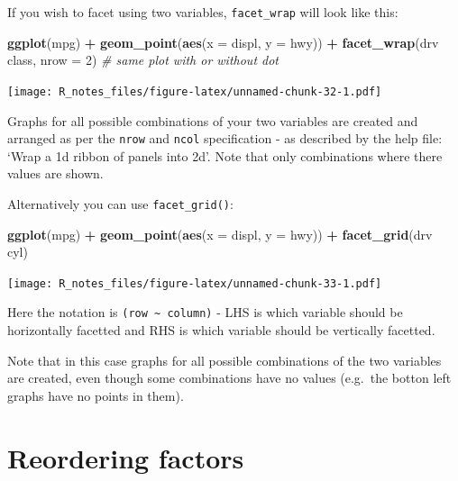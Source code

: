 \documentclass[]{book}
\newenvironment{Shaded}{\begin{snugshade}}{\end{snugshade}}
\newcommand{\KeywordTok}[1]{\textcolor[rgb]{0.13,0.29,0.53}{\textbf{#1}}}
\newcommand{\DataTypeTok}[1]{\textcolor[rgb]{0.13,0.29,0.53}{#1}}
\newcommand{\DecValTok}[1]{\textcolor[rgb]{0.00,0.00,0.81}{#1}}
\newcommand{\StringTok}[1]{\textcolor[rgb]{0.31,0.60,0.02}{#1}}
\newcommand{\CommentTok}[1]{\textcolor[rgb]{0.56,0.35,0.01}{\textit{#1}}}
\newcommand{\OperatorTok}[1]{\textcolor[rgb]{0.81,0.36,0.00}{\textbf{#1}}}
\newcommand{\NormalTok}[1]{#1}
\begin{document}
If you wish to facet using two variables, \texttt{facet\_wrap} will look
like this:

\begin{Shaded}
\begin{Highlighting}[]
\KeywordTok{ggplot}\NormalTok{(mpg) }\OperatorTok{+}\StringTok{ }
\StringTok{  }\KeywordTok{geom_point}\NormalTok{(}\KeywordTok{aes}\NormalTok{(}\DataTypeTok{x =}\NormalTok{ displ, }\DataTypeTok{y =}\NormalTok{ hwy)) }\OperatorTok{+}\StringTok{ }
\StringTok{  }\KeywordTok{facet_wrap}\NormalTok{(drv }\OperatorTok{~}\StringTok{ }\NormalTok{class, }\DataTypeTok{nrow =} \DecValTok{2}\NormalTok{) }\CommentTok{# same plot with or without dot}
\end{Highlighting}
\end{Shaded}

\texttt{[image: R\_notes\_files/figure-latex/unnamed-chunk-32-1.pdf]}

Graphs for all possible combinations of your two variables are created
and arranged as per the \texttt{nrow} and \texttt{ncol} specification -
as described by the help file: `Wrap a 1d ribbon of panels into 2d'.
Note that only combinations where there values are shown.

Alternatively you can use \texttt{facet\_grid()}:

\begin{Shaded}
\begin{Highlighting}[]
\KeywordTok{ggplot}\NormalTok{(mpg) }\OperatorTok{+}\StringTok{ }
\StringTok{  }\KeywordTok{geom_point}\NormalTok{(}\KeywordTok{aes}\NormalTok{(}\DataTypeTok{x =}\NormalTok{ displ, }\DataTypeTok{y =}\NormalTok{ hwy)) }\OperatorTok{+}\StringTok{ }
\StringTok{  }\KeywordTok{facet_grid}\NormalTok{(drv }\OperatorTok{~}\StringTok{ }\NormalTok{cyl)}
\end{Highlighting}
\end{Shaded}

\texttt{[image: R\_notes\_files/figure-latex/unnamed-chunk-33-1.pdf]}

Here the notation is \texttt{(row\ \textasciitilde{}\ column)} - LHS is
which variable should be horizontally facetted and RHS is which variable
should be vertically facetted.

Note that in this case graphs for all possible combinations of the two
variables are created, even though some combinations have no values
(e.g.~the botton left graphs have no points in them).

\section{Reordering factors}\label{reordering-factors}
\end{document}
